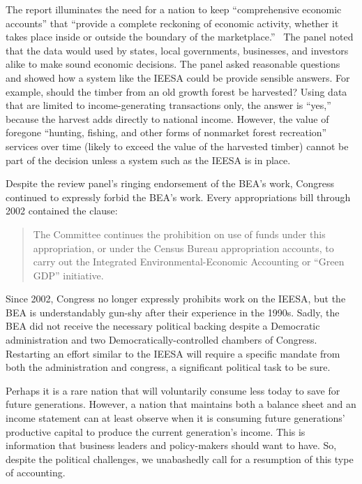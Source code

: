 The report illuminates the need for a nation 
to keep ``comprehensive economic accounts'' that ``provide a complete reckoning of
economic activity, whether it takes place inside or outside 
the boundary of the marketplace.''~\cite[p.~29]{Nordhaus1999a}
The panel noted that the data would used 
by states, local governments, businesses, and investors alike 
to make sound economic decisions. 
The panel asked reasonable questions and showed how a system like the IEESA
could be provide sensible answers.
For example, should the timber from an old growth forest be harvested? 
Using data that are limited to income-generating transactions only, 
the answer is ``yes,''
because the harvest adds directly to national income. 
However, the value of foregone ``hunting, fishing, 
and other forms of nonmarket forest recreation'' 
services over time (likely to exceed the value of the harvested timber)
cannot be part of the decision unless 
a system such as the IEESA is in place.\cite[p.~30]{Nordhaus1999a}

Despite the review panel's ringing endorsement of the BEA's work,
Congress continued to expressly forbid the BEA's work.
Every appropriations bill through 2002 contained the clause:

\begin{quote}
	The Committee continues the prohibition on use of funds under this appropriation,
	or under the Census Bureau appropriation accounts,
	to carry out the Integrated Environmental-Economic Accounting or ``Green GDP'' initiative.
\end{quote}

Since 2002, Congress no longer expressly prohibits work on the IEESA,
but the BEA is understandably gun-shy after their experience in the 1990s.
Sadly, the BEA did not receive the necessary political backing
despite a Democratic administration
and two Democratically-controlled chambers of Congress.
Restarting an effort similar to the IEESA will require a specific
mandate from both the administration and congress, 
a significant political task to be sure.

Perhaps it is a rare nation that will voluntarily consume less today 
to save for future generations. 
However, a nation that maintains both a balance sheet and 
an income statement can at least observe when it is consuming 
future generations' productive capital 
to produce the current generation's income. 
This is information that business leaders and policy-makers should want to have. 
So, despite the political challenges, 
we unabashedly call for a resumption of this type of accounting.

